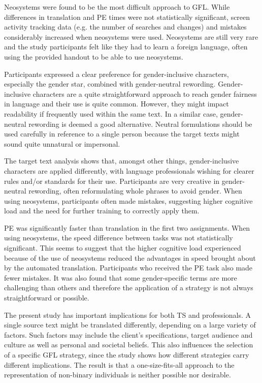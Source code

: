Neosystems were found to be the most difficult approach to GFL. While differences in translation and PE times were not statistically significant, screen activity tracking data (e.g. the number of searches and changes) and mistakes considerably increased when neosystems were used. Neosystems are still very rare and the study participants felt like they had to learn a foreign language, often using the provided handout to be able to use neosystems.

Participants expressed a clear preference for gender-inclusive characters, especially the gender star, combined with gender-neutral rewording. Gender-inclusive characters are a quite straightforward approach to reach gender fairness in language and their use is quite common. However, they might impact readability if frequently used within the same text. In a similar case, gender-neutral rewording is deemed a good alternative. Neutral formulations should be used carefully in reference to a single person because the target texts might sound quite unnatural or impersonal. 

The target text analysis shows that, amongst other things, gender-inclusive characters are applied differently, with language professionals wishing for clearer rules and/or standards for their use. Participants are very creative in gender-neutral rewording, often reformulating whole phrases to avoid gender. When using neosystems, participants often made mistakes, suggesting higher cognitive load and the need for further training to correctly apply them. 

PE was significantly faster than translation in the first two assignments. When using neosystems, the speed difference between tasks was not statistically significant. This seems to suggest that the higher cognitive load experienced because of the use of neosystems reduced the advantages in speed brought about by the automated translation. Participants who received the PE task also made fewer mistakes. It was also found that some gender-specific terms are more challenging than others and therefore the application of a strategy is not always straightforward or possible.

The present study has important implications for both TS and professionals. A single source text might be translated differently, depending on a large variety of factors. Such factors may include the client's specifications, target audience and culture as well as personal and societal beliefs. This also influences the selection of a specific GFL strategy, since the study shows how different strategies carry different implications. The result is that a one-size-fits-all approach to the representation of non-binary individuals is neither possible nor desirable.

